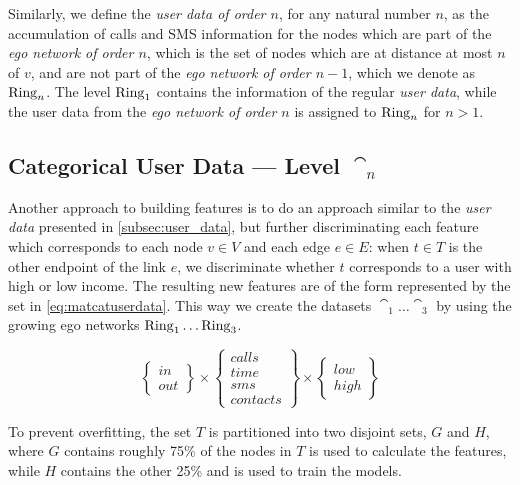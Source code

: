 Similarly, we define the \emph{user data of order $n$}, for any natural number $n$, as the accumulation of calls and SMS information for the nodes which are part of the \emph{ego network of order $n$}, which is the set of nodes which are at distance at most $n$ of $v$, and are not part of the \emph{ego network of order $n - 1$}, which we denote as $\operatorname{Ring}_n$.
The level $\operatorname{Ring}_1$ contains the information of the regular \emph{user data}, %
while the user data from the \emph{ego network of order $n$} is assigned to $\operatorname{Ring}_n$ for $n > 1$.

\subsection{Categorical User Data --- Level $\cat_n$}
\label{subsec:categoricaluserdata}

Another approach to building features is to do an approach similar to the \emph{user data} presented in \cref{subsec:user_data}, but further discriminating each feature which corresponds to each node $v \in V$ and each edge $e \in E$:
when $t \in T$ is the other endpoint of the link $e$, we discriminate whether $t$ corresponds to a user with high or low income.
The resulting new features are of the form represented by the set in \cref{eq:matcatuserdata}. This way we create the datasets $\cat_1 \dots \cat_3$ by using the growing ego networks $\operatorname{Ring}_1 \dots \operatorname{Ring}_3$.

\begin{equation}
\begin{Bmatrix} in \\ out \end{Bmatrix}
\times
\begin{Bmatrix} calls \\ time \\ sms \\ contacts \end{Bmatrix}
\times
\begin{Bmatrix} low \\ high \end{Bmatrix}
\label{eq:matcatuserdata}
\end{equation}

To prevent overfitting, the set $T$ is partitioned into two disjoint sets, $G$ and $H$, where $G$ contains roughly 75\% of the nodes in $T$ is used to calculate the features, while $H$ contains the other 25\% and is used to train the models.

